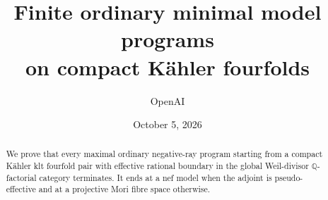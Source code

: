 \documentclass[11pt,reqno]{amsart}
\title[Minimal model programs on Kähler fourfolds]{Finite ordinary minimal model programs\\on compact Kähler fourfolds}
\author{OpenAI}
\date{October 5, 2026}
\theoremstyle{definition}
\theoremstyle{remark}
\numberwithin{equation}{section}
\newcommand{\Q}{\mathbb Q}
\begin{document}
\begin{abstract}
We prove that every maximal ordinary negative-ray program starting from a compact Kähler klt fourfold pair with effective rational boundary in the global Weil-divisor $\Q$-factorial category terminates. It ends at a nef model when the adjoint is pseudo-effective and at a projective Mori fibre space otherwise.
\end{abstract}
\maketitle
\tableofcontents













\appendix



\end{document}
